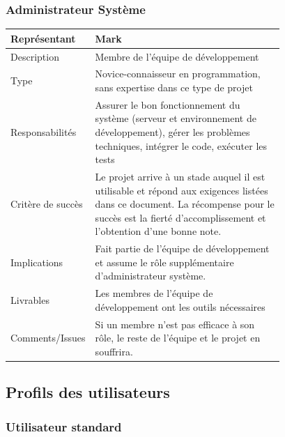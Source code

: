 \documentclass[11pt]{article}
\begin{document}
\subsubsection{Administrateur Système}

\begin{tabular}{|a|L{0.78\linewidth}|}
\hline
Représentant & Mark \\
\hline
Description & Membre de l'équipe de développement \\
\hline
Type & Novice-connaisseur en programmation, sans expertise dans ce type de projet \\
\hline
Responsabilités & Assurer le bon fonctionnement du système (serveur et environnement de développement), gérer les problèmes techniques, intégrer le code, exécuter les tests \\
\hline
Critère de succès & Le projet arrive à un stade auquel il est utilisable et répond aux exigences listées dans ce document. La récompense pour le succès est la fierté d'accomplissement et l'obtention d'une bonne note. \\
\hline
Implications & Fait partie de l'équipe de développement et assume le rôle supplémentaire d'administrateur système. \\
\hline
Livrables & Les membres de l'équipe de développement ont les outils nécessaires  \\
\hline
Comments/Issues & Si un membre n'est pas efficace à son rôle, le reste de l'équipe et le projet en souffrira. \\
\hline
\end{tabular}


\subsection{Profils des utilisateurs}


\subsubsection{Utilisateur standard}
\end{document}
